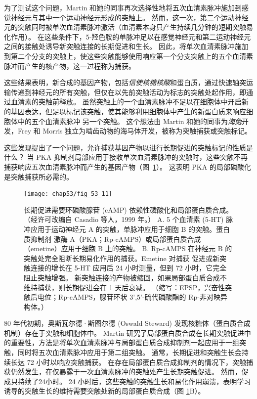 为了测试这个问题，Martin 和她的同事再次选择性地将五次血清素脉冲施加到感觉神经元与其中一个运动神经元形成的突触上。
然而，这一次，第二个运动神经元的突触同时被单次血清素脉冲激活（血清素本身只产生持续几分钟的短期突触易化作用）。
在这些条件下，5-羟色胺的单脉冲足以在感觉神经元和第二运动神经元之间的接触处诱导新突触连接的长期促进和生长。
因此，将单次血清素脉冲施加到第二个分支的突触上，使这些突触能够使用响应第一个分支突触上的五个血清素脉冲而产生的核产物，这一过程称为捕获。


这些结果表明，新合成的基因产物，包括\textit{信使核糖核酸}和蛋白质，通过快速轴突运输传递到神经元的所有突触，但仅在以先前突触活动为标志的突触处起作用，即通过血清素的突触前释放。
虽然突触上的一个血清素脉冲不足以在细胞体中开启新的基因表达，但足以标记该突触，使其能够利用细胞体中产生的新蛋白质来响应细胞体中的五个血清素脉冲 另一个突触。
这个想法由 Martin 和她的同事为\textit{海兔}开发，Frey 和 Morris 独立为啮齿动物的海马体开发，被称为突触捕获或突触标记。


这些发现提出了一个问题，允许捕获基因产物以进行长期促进的突触标记的性质是什么？
当 PKA 抑制剂局部应用于接收单次血清素脉冲的突触时，这些突触不再捕获响应五次血清素脉冲而产生的基因产物（图~\ref{fig:53_11}）。
这表明 PKA 的局部磷酸化是突触捕获所必需的。


\begin{figure}[htbp]
	\centering
	\texttt{[image: chap53/fig\_53\_11]}
	\caption{长期促进需要环磷酸腺苷 (cAMP) 依赖性磷酸化和局部蛋白质合成。 （经许可改编自 Casadio 等人，1999 年。） A. 5 个血清素 (5-HT) 脉冲应用于运动神经元 A 的突触，单脉冲应用于细胞 B 的突触。蛋白质抑制剂 激酶 A（PKA；Rp-cAMPS）或局部蛋白质合成（emetine）应用于细胞 B 上的突触。 B. Rp-cAMPS 在神经元 B 的突触处完全阻断长期易化作用的捕获。Emetine 对捕获 促进或新突触连接的增长在 5-HT 应用后 24 小时测量，但到 72 小时，它完全阻止突触增强。 新突触连接的产物被缩回，如果局部蛋白质合成不维持捕获，则长期促进会在 1 天后衰减。 （缩写：EPSP，兴奋性突触后电位；Rp-cAMPS，腺苷环状 3',5'-硫代磷酸酯的 Rp-非对映异构体。）}
	\label{fig:53_11}
\end{figure}


80 年代初期，奥斯瓦尔德·斯图尔德 (Oswald Steward) 发现核糖体（蛋白质合成机制）存在于突触和细胞体中。
Martin 研究了局部蛋白质合成在长期突触促进中的重要性，方法是将单次血清素脉冲与局部蛋白质合成抑制剂一起应用于一组突触，同时将五次血清素脉冲应用于第二组突触。
通常，长期促进和突触生长会持续长达 72 小时以响应突触捕获。
在存在局部蛋白质合成抑制剂的情况下，突触捕获仍然发生，在仅暴露于一次血清素脉冲的突触处产生长期突触促进。
然而，促成只持续了24小时。
24 小时后，这些突触的突触生长和易化作用崩溃，表明学习诱导的突触生长的维持需要突触处新的局部蛋白质合成（图 \ref{fig:53_11}B）。


